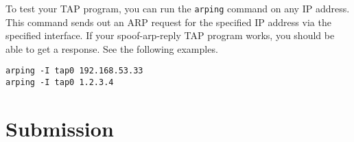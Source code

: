 To test your TAP program, you can run the \texttt{arping} command
on any IP address.  This command sends out an ARP request for the specified IP address 
via the specified interface. 
If your spoof-arp-reply TAP program works, you should be able to get a 
response. See the following examples. 

\begin{lstlisting}
arping -I tap0 192.168.53.33
arping -I tap0 1.2.3.4
\end{lstlisting}

 
 
\section{Submission}












